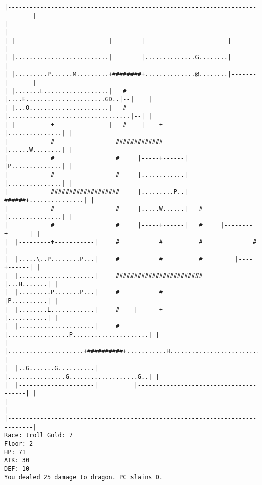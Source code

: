 \documentclass[11pt]{article}
\theoremstyle{plain}
\begin{document}
\begin{Verbatim}[fontsize=\small]
|-----------------------------------------------------------------------------|
|                                                                             |
| |--------------------------|        |-----------------------|               |
| |..........................|        |..............G........|               |
| |.........P......M.........+########+..............@........|-------|       |
| |.......L..................|   #    |....E......................GD..|--|    |
| |...O......................|   #    |..................................|--| |
| |----------+---------------|   #    |----+----------------|...............| |
|            #                 #############                |......W........| |
|            #                 #     |-----+------|         |P..............| |
|            #                 #     |............|         |...............| |
|            ###################     |.........P..|   ######+...............| |
|            #                 #     |.....W......|   #     |...............| |
|            #                 #     |-----+------|   #     |--------+------| |
|  |---------+-----------|     #           #          #              #        |
|  |.....\..P........P...|     #           #          #         |----+------| |
|  |.....................|     ########################         |...H.......| |
|  |.........P.......P...|     #           #                    |P..........| |
|  |........L............|     #    |------+--------------------|...........| |
|  |.....................|     #    |.................P.....................| |
|  |.....................+##########+...........H...........................| |
|  |..G.......G..........|          |................G...................G..| |
|  |---------------------|          |---------------------------------------| |
|                                                                             |
|-----------------------------------------------------------------------------|
Race: troll Gold: 7                                                    Floor: 2
HP: 71
ATK: 30
DEF: 10
You dealed 25 damage to dragon. PC slains D.
\end{Verbatim}
\end{document}
